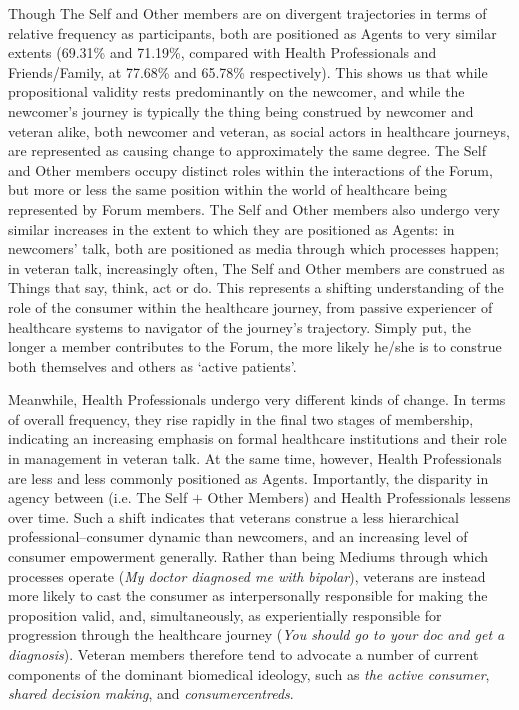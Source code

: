 Though The Self and Other \glspl{member} are on divergent trajectories in terms of relative frequency as participants, both are positioned as Agents to very similar extents (69.31\% and 71.19\%, compared with Health Professionals and Friends\slash Family, at 77.68\% and 65.78\% respectively). This shows us that while propositional validity rests predominantly on the newcomer, and while the newcomer's journey is typically the thing being construed by newcomer and veteran alike, both newcomer and veteran, as social actors in healthcare journeys, are represented as causing change to approximately the same degree. The Self and Other \Glspl{member} occupy distinct roles within the interactions of the \gls{Forum}, but more or less the same position within the world of healthcare being represented by \gls{Forum} \glspl{member}. The Self and Other \glspl{member} also undergo very similar increases in the extent to which they are positioned as Agents: in newcomers' talk, both are positioned as media through which processes happen; in veteran talk, increasingly often, The Self and Other \glspl{member} are construed as Things that say, think, act or do. This represents a shifting understanding of the role of the \gls{consumer} within the healthcare journey, from passive experiencer of healthcare systems to navigator of the journey's trajectory. Simply put, the longer a member contributes to the \gls{Forum}, the more likely he\slash she is to construe both themselves and others as `active patients'.

Meanwhile, Health Professionals undergo very different kinds of change. In terms of overall frequency, they rise rapidly in the final two stages of membership, indicating an increasing emphasis on formal healthcare institutions and their role in  management in veteran talk. At the same time, however, Health Professionals are less and less commonly positioned as Agents. Importantly, the disparity in agency between  (i.e. The Self $+$ Other Members) and Health Professionals lessens over time. Such a shift indicates that veterans construe a less hierarchical professional--\gls{consumer} dynamic than newcomers, and an increasing level of \gls{consumer} empowerment generally. Rather than being Mediums through which processes operate (\emph{My doctor diagnosed me with bipolar}), veterans are instead more likely to cast the \gls{consumer} as interpersonally responsible for making the proposition valid, and, simultaneously, as experientially responsible for progression through the healthcare journey (\emph{You should go to your doc and get a diagnosis}). Veteran \glspl{member} therefore tend to advocate a number of current components of the dominant biomedical ideology, such as \emph{the active \gls{consumer}}, \emph{shared decision making}, and \emph{\glspl{consumercentred}}. %

